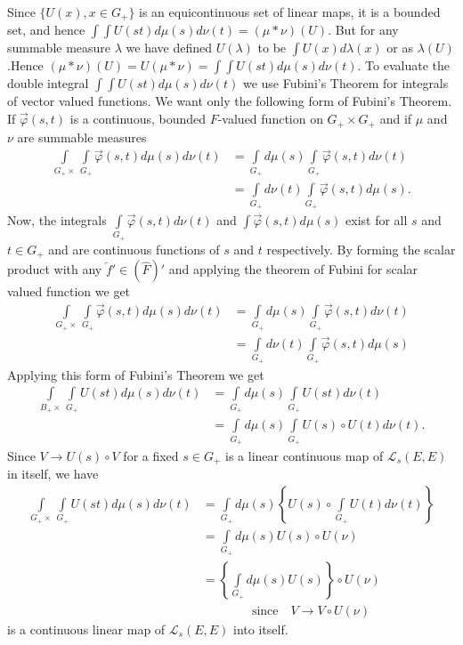 Since $\{U(x), x \in G_+\}$ is an equicontinuous set of
linear maps, it is a bounded set, and hence $\int\int U(st) d \mu(s)
d\nu(t) =(\mu * \nu ) (U)$. But for any summable measure $\lambda$ we
have defined $U(\lambda)$ to be $\int U(x) d \lambda (x)$ or as
$\lambda(U)$.\pageoriginale Hence $(\mu * \nu)(U)=U(\mu *
\nu)=\int\int U(st) d \mu (s) d \nu (t)$. To evaluate the double
integral $\int\int U(st) d \mu (s) d \nu (t)$ we use Fubini's Theorem
for integrals of vector valued functions. We want only the following
form of Fubini's Theorem. If $\overrightarrow{\varphi}(s, t)$ is a
continuous, bounded $F$-valued function on $G_+ \times G_+$ and if
$\mu$ and $\nu$ are summable measures 
\begin{align*}
\int\limits_{G_+\times}\int\limits_{G_+} \overrightarrow{\varphi}(s, t) d
\mu(s) d\nu(t) &= \int\limits_{G_+} d \mu (s) \int\limits_{G_+}
\overrightarrow{\varphi} (s, t)d \nu (t)\\
&= \int\limits_{G_+} d \nu(t) \int\limits_{G_+}
\overrightarrow{\varphi} (s, t) d \mu (s).
\end{align*}
Now, the integrals $\int\limits_{G_+} \overrightarrow{\varphi}(s, t) d
\nu (t)$ and $\int \overrightarrow{\varphi}(s, t) d \mu (s)$ exist for
all $s$ and $t \in G_+$ and are continuous functions of $s$ and $t$
respectively. By forming the scalar product with any
$\overleftarrow{f}' \in (\hat{F})'$ and applying the theorem of Fubini
for scalar valued function we get 
\begin{align*}
\int\limits_{G_+\times}\int\limits_{G_+}\overrightarrow{\varphi} (s,
t) d \mu (s) d \nu (t) &= \int\limits_{G_+} d\mu (s) \int\limits_{G_+}
\overrightarrow{\varphi} (s, t) d \nu (t)\\
& = \int\limits_{G_+} d \nu
(t) \int\limits_{G_+} \overrightarrow{\varphi} (s,t)d\mu(s)
\end{align*}
Applying this form of Fubini's Theorem we get 
\begin{align*}
\int\limits_{B_+\times}\int\limits_{G_+}U(st)d\mu(s)d\nu(t) &=
\int\limits_{G_+} d\mu(s) \int\limits_{G_+} U(st) d\nu(t)\\
&= \int\limits_{G_+} d\mu(s) \int\limits_{G_+} U(s)\circ U(t) d \nu (t).
\end{align*}
Since $V \to U(s) \circ V$ for a fixed $s \in G_+$ is a linear
continuous map of $\mathscr{L}_s(E, E)$ in itself, we have 
\begin{align*}
\int\limits_{G_+\times}\int\limits_{G_+} U(st) d\mu(s) d\nu(t) &=
\int\limits_{G_+} d\mu(s) \left\{ U(s)\circ \int\limits_{G_+}
U(t)d\nu(t) \right\}\\
&= \int\limits_{G_+}d\mu(s)U(s)\circ U(\nu)\\
&= \left\{\int\limits_{G_+}d\mu(s)U(s)\right\}\circ U(\nu) \quad\\
&\qquad\qquad\text{since} \quad V \to V\circ U(\nu)
\end{align*}
is a continuous linear map of $\mathscr{L}_s(E, E)$ into itself. 

